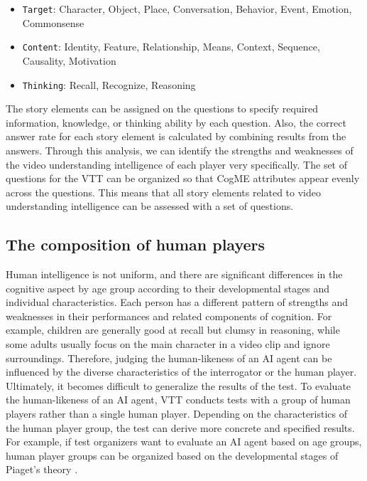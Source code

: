 \documentclass[letterpaper]{article} %
\begin{document}
\begin{itemize}
    \item \texttt{Target}: Character, Object, Place, Conversation, Behavior, Event, Emotion, Commonsense
    \item \texttt{Content}: Identity, Feature, Relationship, Means, Context, Sequence, Causality, Motivation
    \item \texttt{Thinking}: Recall, Recognize, Reasoning
\end{itemize}

The story elements can be assigned on the questions to specify required information, knowledge, or thinking ability by each question. Also, the correct answer rate for each story element is calculated by combining results from the answers. Through this analysis, we can identify the strengths and weaknesses of the video understanding intelligence of each player very specifically.
The set of questions for the VTT can be organized so that CogME attributes appear evenly across the questions. This means that all story elements related to video understanding intelligence can be assessed with a set of questions.

\subsection{The composition of human players}
Human intelligence is not uniform, and there are significant differences in the cognitive aspect by age group according to their developmental stages and individual characteristics. Each person has a different pattern of strengths and weaknesses in their performances and related components of cognition. For example, children are generally good at recall but clumsy in reasoning, while some adults usually focus on the main character in a video clip and ignore surroundings. Therefore, judging the human-likeness of an AI agent can be influenced by the diverse characteristics of the interrogator or the human player. Ultimately, it becomes difficult to generalize the results of the test. To evaluate the human-likeness of an AI agent, VTT conducts tests with a group of human players rather than a single human player. Depending on the characteristics of the human player group, the test can derive more concrete and specified results. For example, if test organizers want to evaluate an AI agent based on age groups, human player groups can be organized based on the developmental stages of Piaget's theory \cite{Piaget1972CogDev}.
\end{document}
